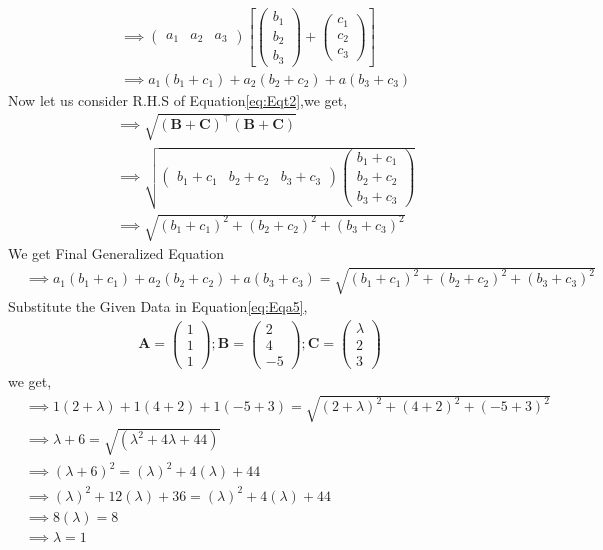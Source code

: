 \documentclass[10pt, a4paper]{article}
\newcommand{\myvec}[1]{\ensuremath{\begin{pmatrix}#1\end{pmatrix}}}
\let\vec\mathbf
\providecommand{\brak}[1]{\ensuremath{\left(#1\right)}}
\providecommand{\sbrak}[1]{\ensuremath{{}\left[#1\right]}}
\begin{document}
\begin{enumerate}
\begin{align}
   &\implies \myvec{a_1&a_2&a_3}\sbrak{\myvec{b_1\\b_2\\b_3}+\myvec{c_1\\c_2\\c_3}}\\
   &\implies a_1(b_1+c_1)+a_2(b_2+c_2)+a(b_3+c_3)
\end{align}
Now let us consider R.H.S of Equation\eqref{eq:Eqt2},we get,
\begin{align}
    &\implies \sqrt{\brak{\vec{B}+\vec{C}}^\top\brak{\vec{B}+\vec{C}}}\\
    &\implies \sqrt{\myvec{b_1+c_1&b_2+c_2&b_3+c_3}\myvec{b_1+c_1\\b_2+c_2\\b_3+c_3}}\\
    &\implies \sqrt{\brak{b_1+c_1}^2+\brak{b_2+c_2}^2+\brak{b_3+c_3}^2}
\end{align}
We get Final Generalized Equation
\begin{align}
     &\implies a_1(b_1+c_1)+a_2(b_2+c_2)+a(b_3+c_3)= \sqrt{\brak{b_1+c_1}^2+\brak{b_2+c_2}^2+\brak{b_3+c_3}^2} \label{eq:Eqa5}
\end{align}
Substitute the Given Data in Equation\eqref{eq:Eqa5},
\begin{align*}
	\vec{A}=\myvec{1\\1\\1};\vec{B}=\myvec{2\\4\\-5};\vec{C}=\myvec{\lambda\\2\\3}
\end{align*}
we get,
\begin{align}   
&\implies 1\brak{2+\lambda}+1\brak{4+2}+1\brak{-5+3}=\sqrt{\brak{2+\lambda}^2+\brak{4+2}^2+\brak{-5+3}^2}\\
& \implies \lambda +6 = \sqrt{\brak{\lambda ^2+4 \lambda +44}}\\
& \implies\brak{ \lambda +6}^2 = \brak{\lambda} ^2+4 \brak{\lambda} +44\\
& \implies \brak{\lambda}^2+12\brak{ \lambda }+36 = \brak{ \lambda }^2+4 \brak{\lambda} +44\\
& \implies  8\brak{\lambda} = 8\\
 &\implies \lambda = 1
\end{align}
\end{enumerate}
\end{document}
